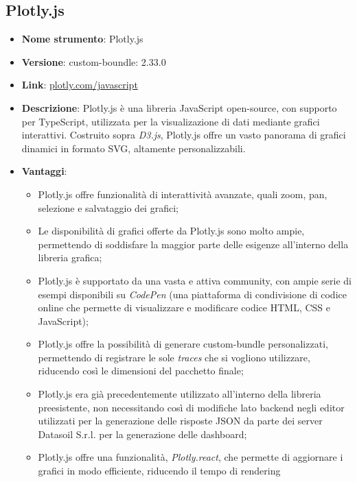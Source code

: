
\subsection{Plotly.js}
\begin{itemize}
\item \textbf{Nome strumento}: Plotly.js
\item \textbf{Versione}: custom-boundle: 2.33.0
\item \textbf{Link}: \href{https://plotly.com/javascript/}{plotly.com/javascript}
\item \textbf{Descrizione}: Plotly.js è una libreria JavaScript open-source, con supporto per TypeScript, utilizzata per la visualizazione di dati mediante grafici interattivi.
Costruito sopra \textit{D3.js}, Plotly.js offre un vasto panorama di grafici dinamici in formato SVG, altamente personalizzabili.
\item \textbf{Vantaggi}:
\begin{itemize}
      \item Plotly.js offre funzionalità di interattività avanzate, quali zoom, pan, selezione e salvataggio dei grafici;
      \item Le disponibilità di grafici offerte da Plotly.js sono molto ampie, permettendo di soddisfare la maggior parte delle esigenze
            all'interno della libreria grafica;
      \item Plotly.js è supportato da una vasta e attiva community, con ampie serie di esempi disponibili su \textit{CodePen} (una piattaforma di condivisione di codice
            online che permette di visualizzare e modificare codice HTML, CSS e JavaScript);
      \item Plotly.js offre la possibilità di generare custom-bundle personalizzati, permettendo di registrare le sole \textit{traces} che si vogliono utilizzare, riducendo
            così le dimensioni del pacchetto finale;
      \item Plotly.js era già precedentemente utilizzato all'interno della libreria preesistente, non necessitando così di modifiche lato backend negli editor
            utilizzati per la generazione delle risposte JSON da parte dei server Datasoil S.r.l. per la generazione delle dashboard;
      \item Plotly.js offre una funzionalità, \textit{Plotly.react}, che permette di aggiornare i grafici in modo efficiente, riducendo il tempo di rendering

\end{itemize}
\end{itemize}
